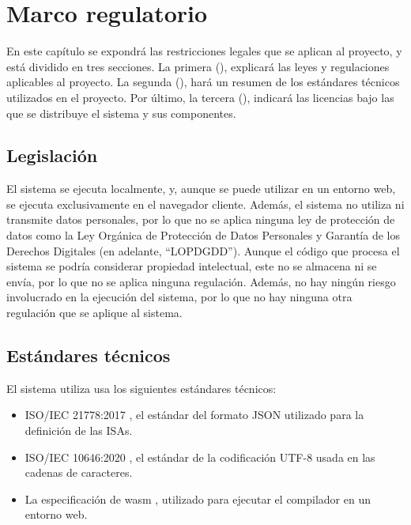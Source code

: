 \chapter{Marco regulatorio}\label{chap:regulation}

En este capítulo se expondrá las restricciones legales que se aplican al
proyecto, y está dividido en tres secciones. La primera
(), explicará las leyes y regulaciones aplicables al
proyecto. La segunda (), hará un resumen de los estándares
técnicos utilizados en el proyecto. Por último, la tercera
(), indicará las licencias bajo las que se distribuye el
sistema y sus componentes.

\section{Legislación}\label{sec:legislation}

El sistema se ejecuta localmente, y, aunque se puede utilizar en un entorno web,
se ejecuta exclusivamente en el navegador cliente. Además, el sistema no utiliza
ni transmite datos personales, por lo que no se aplica ninguna ley de protección
de datos como la Ley Orgánica de Protección de Datos Personales y Garantía de
los Derechos Digitales (en adelante, ``LOPDGDD''). Aunque el código
 que procesa el sistema se podría considerar
propiedad intelectual, este no se almacena ni se envía, por lo que no se aplica
ninguna regulación. Además, no hay ningún riesgo involucrado en la ejecución del
sistema, por lo que no hay ninguna otra regulación que se aplique al sistema.

\section{Estándares técnicos}\label{sec:standards}

\noindent
El sistema utiliza usa los siguientes estándares técnicos:

\begin{itemize}
    \item ISO/IEC 21778:2017 \parencite{JSONStandard}, el estándar del formato
    JSON utilizado para la definición de las \glspl{ISA}.
    \item ISO/IEC 10646:2020 \parencite{UTF-8}, el estándar de la codificación
    UTF-8 usada en las cadenas de caracteres.
    \item La especificación de \gls{wasm} \parencite{wasm-spec}, utilizado para
    ejecutar el compilador en un entorno web.
\end{itemize}

